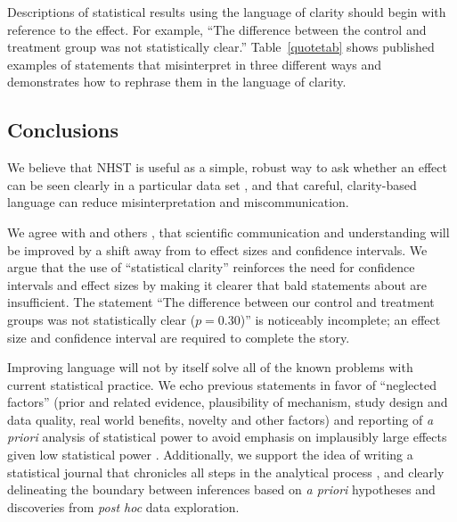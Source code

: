 Descriptions of statistical results using the language of clarity should begin with reference to the effect. 
For example, ``The difference between the control and treatment group was not statistically clear.'' Table~\ref{quotetab} shows published examples of statements that misinterpret \pvals in three different ways and demonstrates how to rephrase them in the language of clarity.

\clearpage



\clearpage

\subsection*{Conclusions}

We believe that NHST is useful as a simple, robust way to ask whether an effect can be seen clearly in a particular data set \citep{robinson2001past}, and that careful, clarity-based language can reduce misinterpretation and miscommunication.

We agree with \citet{Cohen1994} and others \citep{Goodman1999, ZiliakandMcCloskey2008, WassersteinandLazar2016}, that scientific communication and understanding will be improved by a shift away from \pvals to effect sizes and confidence intervals. 
We argue that the use of ``statistical clarity'' reinforces the need for confidence intervals and effect sizes by making it clearer that bald statements about \pvals are insufficient. 
The statement ``The difference between our control and treatment groups was not statistically clear ($p = 0.30$)'' is noticeably incomplete; an effect size and confidence interval are required to complete the story.

Improving language will not by itself solve all of the known problems with current statistical practice. We echo previous statements in favor of ``neglected factors'' (prior and related evidence, plausibility of mechanism, study design and data quality, real world benefits, novelty and other factors) \citep{McShaneetal.2017} and reporting of \emph{a priori} analysis of statistical power to avoid emphasis on implausibly large effects given low statistical power \citep[the ``winner's curse''][]{GelmanandCarlin2014, SzucsandIoannidis2017, Bernardietal.2017}.  
Additionally, we support the idea of writing a statistical journal that chronicles all steps in the analytical process \citep{Kassetal.2016}, and clearly delineating the boundary between inferences based on \emph{a priori} hypotheses and discoveries from \emph{post hoc} data exploration.

